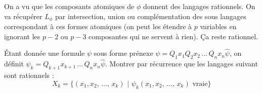 \documentclass[12pt,letterpaper,boxed]{hmcpset}
\begin{document}
\begin{solution}

On a vu que les composants atomiques de $\phi$ donnent des langages rationnels. On va récupérer $L_{\phi}$ par intersection, union ou complémentation des sous langages correspondant à ces formes atomiques (on peut les étendre à $p$ variables en ignorant les $p-2$ ou $p-3$ composantes qui ne servent à rien). Ça reste rationnel.

\end{solution}

\begin{problem}[Question 4]
Étant donnée une formule $\psi$ sous forme prénexe $\psi = Q_{1}x_{1}Q_{2}x_{2} \, \dots \, Q_{n}x_{n}\hat \psi$, on définit $\psi_k = Q_{k+1}x_{k+1} \, \dots \, Q_{n}x_{n}\hat \psi$.
Montrer par récurrence que les langages suivant sont rationnels :%
$$ X_{k} = \{(x_{1}, x_{2}, \, \dots , \, x_{k}) \, \, | \, \, \psi_k(x_{1}, x_{2}, \, \dots , \, x_{k}) \text{ vraie} \}$$
\end{problem}
\newpage
\end{document}
